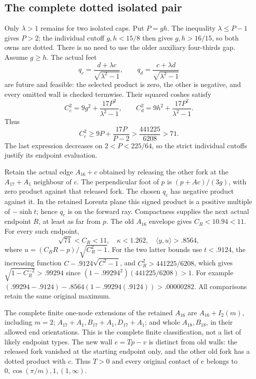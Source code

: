 \documentclass[11pt]{article}
\theoremstyle{definition}
\theoremstyle{remark}
\newcommand{\ip}[2]{\langle #1,#2\rangle}
\begin{document}
\subsection{The complete dotted isolated pair}
\label{app:D18isolateddotted}

Only \(\lambda>1\) remains for two isolated caps.
Put \(P=gh\).  The inequality \(\lambda\le P-1\)
gives \(P>2\); the individual cutoff \(g,h<15/8\)
then gives \(g,h>16/15\), so both owns are dotted.
There is no need to use the older auxiliary four-thirds gap.
Assume \(g\ge h\).
The actual feet
\[
 q_c={\frac{d+\lambda c}{\sqrt{\lambda^2-1}}},\qquad
 q_d={\frac{c+\lambda d}{\sqrt{\lambda^2-1}}}
\]
are future and feasible: the selected product is zero, the other
is negative, and every omitted wall is checked termwise.
Their squared coshes satisfy
\[
 C_c^2=9g^2+{\frac{17P^2}{\lambda^2-1}},\qquad
 C_d^2=9h^2+{\frac{17P^2}{\lambda^2-1}}.
\]
Thus
\[
 C_c^2\ge9P+{\frac{17P}{ P-2}}
 >{\frac{441225}{6208}}>71.
\]
The last expression decreases on \(2<P<225/64\), so the strict
individual cutoffs justify its endpoint evaluation.

Retain the actual edge \(A_{16}+c\) obtained by releasing the other
fork at the \(A_{17}+A_1\) neighbour of \(c\).
The perpendicular foot of \(p\) is
\((p+Ac)/(3g)\), with zero product against that released fork.
The chosen \(q_c\) has negative product against it.
In the retained Lorentz plane this signed product is a positive
multiple of \(-\sinh t\); hence \(q_c\) is on the forward ray.
Compactness supplies the next actual endpoint \(R\), at least as
far from \(p\).  The old \(A_{16}\) envelope gives \(C_R<10.94<11\).
For every such endpoint,
\[
 \sqrt{71}<C_R<11,\quad
 \kappa<1.262,\quad \ip yu>.8564 ,
\tag{DIIdot}\label{eq:DIIdot}
\]
where \(u=(C_RR-p)/\sqrt{C_R^2-1}\).
For the two latter bounds use \(t<.9124\), the increasing function
\(C-.9124\sqrt{C^2-1}\), and
\(C_R^2>441225/6208\), which gives
\(\sqrt{1-C_R^{-2}}>.99294\) since
\((1-.99294^2)(441225/6208)>1\).
For example
\((.99294-.9124)-.8564(1-.99294(.9124))>.00000282\).
All comparisons retain the same original maximum.

The complete finite one-node extensions of the retained \(A_{16}\)
are \(A_{16}+I_2(m)\), including \(m=2\);
\(A_{17}+A_1,B_{17}+A_1,D_{17}+A_1\);
and whole \(A_{18},B_{18}\), in their allowed end orientations.
This is the complete finite classification, not a list of likely
endpoint types.  The new wall \(e=Tp-v\) is distinct from old
walls: the released fork vanished at the starting endpoint only,
and the other old fork has a dotted product with \(c\).
Thus \(T>0\) and every original contact of \(e\) belongs to
\(0,\cos(\pi/m),1,(1,\infty)\).
\end{document}
